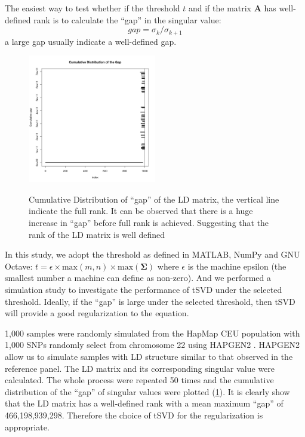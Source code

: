 \documentclass[12pt]{scrbook}
\begin{document}
The easiest way to test whether if the threshold $t$ and if the matrix $\boldsymbol{A}$ has well-defined rank is to calculate the ``gap'' in the singular value:
\begin{equation}
gap = \sigma_k/\sigma_{k+1}
\label{eq:gapSingular}
\end{equation}
a large gap usually indicate a well-defined gap. 
\begin{figure}
	\caption[Cumulative Distribution of ``gap'' of the LD matrix]{Cumulative Distribution of ``gap'' of the LD matrix, the vertical line indicate the full rank. It can be observed that there is a huge increase in ``gap'' before full rank is achieved. Suggesting that the rank of the LD matrix is well defined}
	\centering
	\includegraphics[width=0.5\textwidth]{figure/singular_value_distribution.png}
	\label{fig:singularValueDist}
	\vspace{-20pt}
\end{figure}
In this study, we adopt the threshold as defined in MATLAB, NumPy and GNU Octave: $t=\epsilon\times\mathrm{max}(m,n)\times\mathrm{max}(\boldsymbol{\Sigma})$ where $\epsilon$ is the machine epsilon (the smallest number a machine can define as non-zero). 
And we performed a simulation study to investigate the performance of \gls{tSVD} under the selected threshold.
Ideally, if the ``gap'' is large under the selected threshold, then \gls{tSVD} will provide a good regularization to the equation. 

1,000 samples were randomly simulated from the HapMap \citep{Altshuler2010} \gls{CEU} population with 1,000 \glspl{SNP} randomly select from chromosome 22 using HAPGEN2 \citep{Su2011}.
HAPGEN2 allow us to simulate samples with \gls{LD} structure similar to that observed in the reference panel.
The \gls{LD} matrix and its corresponding singular value were calculated. 
The whole process were repeated 50 times and the cumulative distribution of the ``gap'' of singular values were plotted (\cref{fig:singularValueDist}). 
It is clearly show that the \gls{LD} matrix has a well-defined rank with a mean maximum ``gap'' of 466,198,939,298.
Therefore the choice of \gls{tSVD} for the regularization is appropriate.
\end{document}
